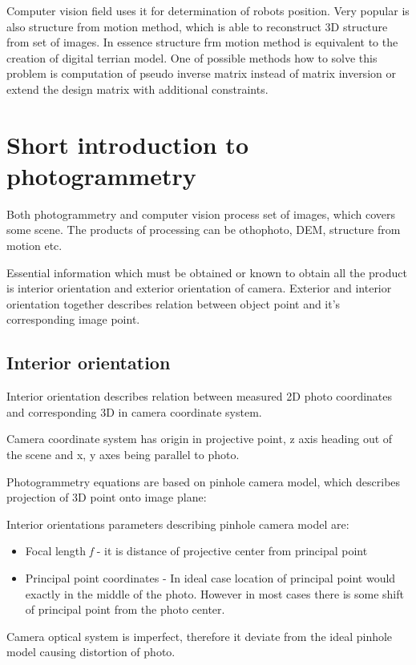 \documentclass[a4paper,12pt]{report}
\newcommand{\escal}[1]{
{\it #1}
}
\begin{document}
Computer vision field uses it for determination of robots position. Very popular is also structure from motion method,
which is able to reconstruct 3D structure from set of images. In essence structure frm motion method is equivalent to the creation 
of digital terrian model.
One of possible methods how to solve this problem is computation of pseudo inverse matrix instead of matrix inversion or 
extend the design matrix with additional constraints.

\section{Short introduction to photogrammetry}

Both photogrammetry and computer vision process set of images, which covers some scene.
The products of processing can be othophoto, DEM, structure from motion etc. 

Essential information which must be obtained or known to obtain all the product is 
interior orientation and exterior orientation of camera.
Exterior and interior orientation together describes relation between object point and
it's corresponding image point.  

\subsection{Interior orientation}

Interior orientation describes relation between measured 2D photo coordinates 
and corresponding 3D in camera coordinate system.

Camera coordinate system has origin in projective point, z axis heading out of the scene  and x, y axes being parallel to photo. 

Photogrammetry equations are based on pinhole camera model, which describes projection of 3D point onto image plane:

Interior orientations parameters describing pinhole camera model are:
\begin{itemize}
  \item Focal length \escal{f} - it is distance of projective center from principal point
  \item Principal point coordinates - In ideal case location of principal point would exactly in the middle 
	of the photo.  
	However in most cases there is some shift of principal point from the photo center.
\end{itemize}

Camera optical system is imperfect, therefore it deviate from the ideal pinhole model  
 causing distortion of photo.
\end{document}
